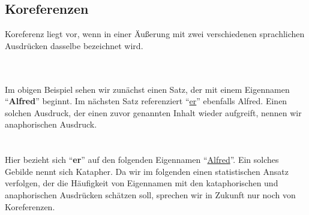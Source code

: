 \subsection{Koreferenzen}

\begin{defi}
	Koreferenz liegt vor, wenn in einer Äußerung mit zwei verschiedenen sprachlichen Ausdrücken dasselbe bezeichnet wird.
\end{defi}

\\
\\
Im obigen Beispiel sehen wir zunächst einen Satz, der mit einem Eigennamen ``\textbf{Alfred}'' beginnt. Im nächsten Satz referenziert ``\underline{er}'' ebenfalls Alfred. Einen solchen Ausdruck, der einen zuvor genannten Inhalt wieder aufgreift, nennen wir anaphorischen Ausdruck.\\
\\
\\
Hier bezieht sich ``\textbf{er}'' auf den folgenden Eigennamen ``\underline{Alfred}''. Ein solches Gebilde nennt sich Katapher. Da wir im folgenden einen statistischen Ansatz verfolgen, der die Häufigkeit von Eigennamen mit den kataphorischen und anaphorischen Ausdrücken schätzen soll, sprechen wir in Zukunft nur noch von Koreferenzen.
